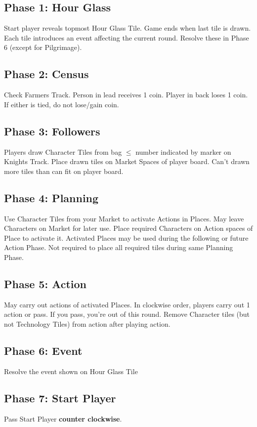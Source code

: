 \documentclass[8pt]{article}
\begin{document}
\begin{multicols*}{2}
    \subsection*{Phase 1: Hour Glass}
    Start player reveals topmost Hour Glass Tile. Game ends when last tile is drawn. Each tile introduces an event affecting the current round. Resolve these in Phase 6 (except for Pilgrimage).

    \subsection*{Phase 2: Census}
    Check Farmers Track. Person in lead receives 1 coin. Player in back loses 1 coin. If either is tied, do not lose/gain coin.
    
    \subsection*{Phase 3: Followers}
    Players draw Character Tiles from bag $\le$ number indicated by marker on Knights Track. Place drawn tiles on Market Spaces of player board. Can't drawn more tiles than can fit on player board.

    \subsection*{Phase 4: Planning}
    Use Character Tiles from your Market to activate Actions in Places. May leave Characters on Market for later use. Place required Characters on Action spaces of Place to activate it. Activated Places may be used during the following or future Action Phase. Not required to place all required tiles during same Planning Phase.
    
    \subsection*{Phase 5: Action}
    May carry out actions of activated Places. In clockwise order, players carry out 1 action or pass. If you pass, you're out of this round. Remove Character tiles (but not Technology Tiles) from action after playing action.

    \subsection*{Phase 6: Event}
    Resolve the event shown on Hour Glass Tile

    \subsection*{Phase 7: Start Player}
    Pass Start Player \textbf{counter clockwise}.


\end{multicols*}
\end{document}
